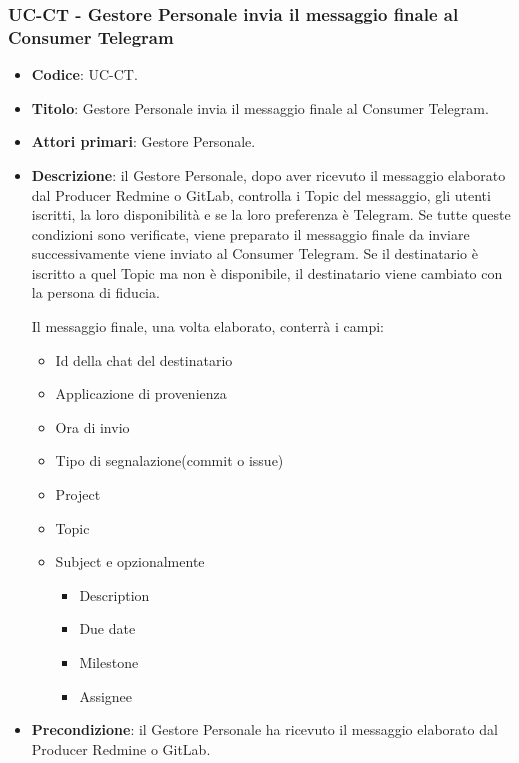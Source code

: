 \subsubsection{UC\theuccount-CT - Gestore Personale invia il messaggio finale al Consumer Telegram}
	\begin{itemize}
		\item \textbf{Codice}: UC\theuccount-CT.
		\item \textbf{Titolo}: Gestore Personale invia il messaggio finale al Consumer Telegram.
		\item \textbf{Attori primari}: Gestore Personale.
		\item \textbf{Descrizione}: il Gestore Personale, dopo aver ricevuto il messaggio elaborato
		dal Producer Redmine o GitLab, controlla i Topic del messaggio, gli utenti iscritti, la loro disponibilità e se la loro preferenza è Telegram.
		Se tutte queste condizioni sono verificate, viene preparato il messaggio finale da inviare successivamente viene inviato al Consumer Telegram. 
		Se il destinatario è iscritto a quel Topic ma non è disponibile, il destinatario viene cambiato con la persona di fiducia. \par
		Il messaggio finale, una volta elaborato, conterrà i campi:
		\begin{itemize}
			\item Id della chat del destinatario
			\item Applicazione di provenienza
			\item Ora di invio
			\item Tipo di segnalazione(commit o issue)
			\item Project
			\item Topic
			\item Subject e opzionalmente
		 	\begin{itemize}
				\item Description
				\item Due date
				\item Milestone
				\item Assignee
			\end{itemize}
		\end{itemize}
		\item \textbf{Precondizione}: il Gestore Personale ha ricevuto il messaggio elaborato dal Producer Redmine o GitLab.

\end{itemize}
